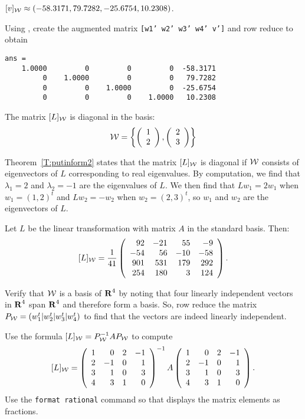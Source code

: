\ans $[v]_{\cal W} \approx (-58.3171, 79.7282, -25.6754, 10.2308)$.

\soln Using \Matlab, create the augmented matrix
{\tt [w1' w2' w3' w4' v']} and row reduce to obtain
\begin{verbatim}
ans =
    1.0000         0         0         0  -58.3171
         0    1.0000         0         0   79.7282
         0         0    1.0000         0  -25.6754
         0         0         0    1.0000   10.2308
\end{verbatim}

\ans The matrix $[L]_{\cal W}$ is diagonal in the basis:
\[
{\cal W} = \left\{\left(\begin{array}{r} 1 \\ 2\end{array}\right),\left(\begin{array}{r} 2 \\ 3\end{array}\right)\right\}
\]

\soln Theorem~\ref{T:putinform2} states
that the matrix $[L]_{\cal W}$ is diagonal if ${\cal W}$ consists of
eigenvectors of $L$ corresponding to real eigenvalues.  By
computation, we find that $\lambda_1 = 2$ and $\lambda_2 = -1$ are
the eigenvalues of $L$.  We then find that $Lw_1 = 2w_1$ when
$w_1 = (1,2)^t$ and $Lw_2 = -w_2$ when $w_2 = (2,3)^t$, so $w_1$ and
$w_2$ are the eigenvectors of $L$.

 \ans Let $L$ be the linear transformation with matrix $A$ in
the standard basis.  Then:
\[
[L]_{\cal W} = \frac{1}{41}\left(\begin{array}{rrrr} 92 & -21 & 55 &
-9 \\ -54 & 56 & -10 & -58 \\ 901 & 531 & 179 & 292 \\ 254 & 180 & 3 &
124 \end{array}\right).
\]

\soln Verify that ${\cal W}$ is a basis of $\mbox{$\bf{R}$}^4$ by noting that
four linearly independent vectors in $\mbox{$\bf{R}$}^4$ span $\mbox{$\bf{R}$}^4$ and
therefore form a basis.  So, row reduce the matrix
$P_{\cal W} = (w_1^t|w_2^t|w_3^t|w_4^t)$ to find that the vectors are indeed
linearly independent.

\para Use the formula $[L]_{\cal W} = P_{\cal W}^{-1}AP_{\cal W}$ to compute
\[
[L]_{\cal W} = \left(\begin{array}{rrrr} 1 & 0 & 2 & -1 \\ 2 & -1 & 0
& 1 \\ 3 & 1 & 0 & 3 \\ 4 & 3 & 1 & 0 \end{array}\right)^{-1} A
\left(\begin{array}{rrrr} 1 & 0 & 2 & -1 \\ 2 & -1
& 0 & 1 \\ 3 & 1 & 0 & 3 \\ 4 & 3 & 1 & 0 \end{array}\right).
\]
Use the {\tt format rational} command so that \Matlab displays
the matrix elements as fractions.


